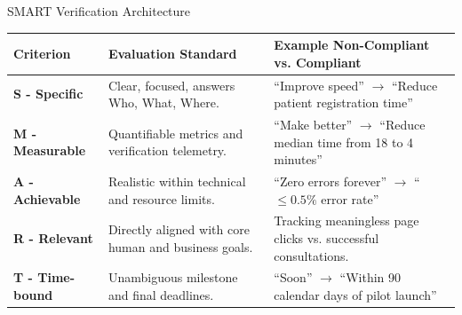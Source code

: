 \begin{canvasbox}{SMART Verification Architecture}
\begin{tabularx}{\linewidth}{|l|X|l|} \hline
\textbf{Criterion} & \textbf{Evaluation Standard} & \textbf{Example Non-Compliant vs. Compliant} \\ \hline
\textbf{S - Specific} & Clear, focused, answers Who, What, Where. & ``Improve speed'' $\to$ ``Reduce patient registration time'' \\ \hline
\textbf{M - Measurable} & Quantifiable metrics and verification telemetry. & ``Make better'' $\to$ ``Reduce median time from 18 to 4 minutes'' \\ \hline
\textbf{A - Achievable} & Realistic within technical and resource limits. & ``Zero errors forever'' $\to$ ``$\le 0.5\%$ error rate'' \\ \hline
\textbf{R - Relevant} & Directly aligned with core human and business goals. & Tracking meaningless page clicks vs. successful consultations. \\ \hline
\textbf{T - Time-bound} & Unambiguous milestone and final deadlines. & ``Soon'' $\to$ ``Within 90 calendar days of pilot launch'' \\ \hline
\end{tabularx}
\end{canvasbox}
